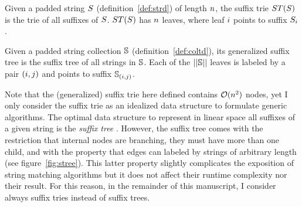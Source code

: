 
\begin{definition}
Given a padded string $S$ (definition~\ref{def:strd}) of length $n$, the suffix trie $ST(S)$ is the trie of all suffixes of $S$.
$ST(S)$ has $n$ leaves, where leaf $i$ points to suffix ${S}_{i}$.
\end{definition}

\begin{definition}
Given a padded string collection $\mathbb{S}$ (definition~\ref{def:coltd}), its generalized suffix tree is the suffix tree of all strings in $\mathbb{S}$.
Each of the $||\mathbb{S}||$ leaves is labeled by a pair $(i,j)$ and points to suffix ${\mathbb{S}}_{(i,j)}$.

\end{definition}

\begin{figure}[b]
\caption[Example of suffix trie and suffix tree]{Suffix trie and suffix tree of the string {\ttfamily ANANAS\$} .}
\label{fig:stree}
\begin{subfigure}[b]{.5\textwidth}
\begin{center}

\end{center}
\end{subfigure}%
\begin{subfigure}[b]{.5\textwidth}
\begin{center}

\vspace{6mm}
\end{center}
\end{subfigure}
\end{figure}

Note that the (generalized) suffix trie here defined contains $\mathcal{O}(n^2)$ nodes, yet I only consider the suffix trie as an idealized data structure to formulate generic algorithms.
The optimal data structure to represent in linear space all suffixes of a given string is the \emph{suffix tree} \citep{Morrison1968}.
However, the suffix tree comes with the restriction that internal nodes are branching, \ie they must have more than one child, and with the property that edges can labeled by strings of arbitrary length (see figure~\ref{fig:stree}).
This latter property slightly complicates the exposition of string matching algorithms but it does not affect their runtime complexity nor their result.
For this reason, in the remainder of this manuscript, I consider \wlogs always suffix tries instead of suffix trees.

